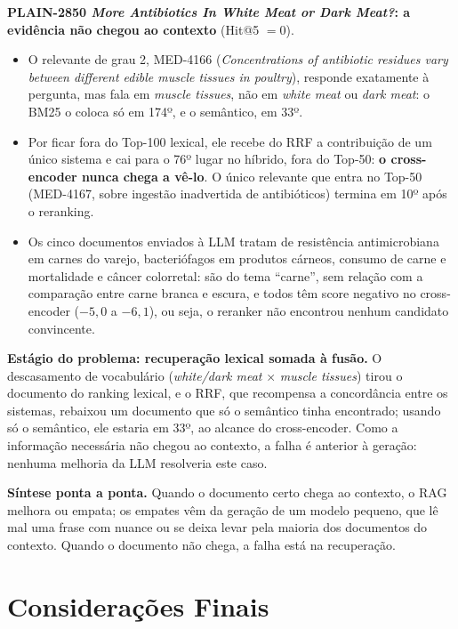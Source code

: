 \documentclass[10pt,a4paper]{article}
\newcommand{\med}[1]{\mbox{MED-#1}}         %
\newcommand{\pq}[1]{\mbox{PLAIN-#1}}        %
\begin{document}
\textbf{\pq{2850} \emph{More Antibiotics In White Meat or Dark Meat?}: a evidência não chegou ao contexto} (Hit@5 $= 0$).
\begin{itemize}
\item O relevante de grau 2, \med{4166} (\emph{Concentrations of antibiotic residues vary between different edible muscle tissues in poultry}), responde exatamente à pergunta, mas fala em \emph{muscle tissues}, não em \emph{white meat} ou \emph{dark meat}: o BM25 o coloca só em 174º, e o semântico, em 33º.
\item Por ficar fora do Top-100 lexical, ele recebe do RRF a contribuição de um único sistema e cai para o 76º lugar no híbrido, fora do Top-50: \textbf{o cross-encoder nunca chega a vê-lo}. O único relevante que entra no Top-50 (\med{4167}, sobre ingestão inadvertida de antibióticos) termina em 10º após o reranking.
\item Os cinco documentos enviados à LLM tratam de resistência antimicrobiana em carnes do varejo, bacteriófagos em produtos cárneos, consumo de carne e mortalidade e câncer colorretal: são do tema ``carne'', sem relação com a comparação entre carne branca e escura, e todos têm score negativo no cross-encoder ($-5{,}0$ a $-6{,}1$), ou seja, o reranker não encontrou nenhum candidato convincente.
\end{itemize}
\textbf{Estágio do problema: recuperação lexical somada à fusão.} O descasamento de vocabulário (\emph{white/dark meat} $\times$ \emph{muscle tissues}) tirou o documento do ranking lexical, e o RRF, que recompensa a concordância entre os sistemas, rebaixou um documento que só o semântico tinha encontrado; usando só o semântico, ele estaria em 33º, ao alcance do cross-encoder. Como a informação necessária não chegou ao contexto, a falha é anterior à geração: nenhuma melhoria da LLM resolveria este caso.

\textbf{Síntese ponta a ponta.} Quando o documento certo chega ao contexto, o RAG melhora ou empata; os empates vêm da geração de um modelo pequeno, que lê mal uma frase com nuance ou se deixa levar pela maioria dos documentos do contexto. Quando o documento não chega, a falha está na recuperação.

\section{Considerações Finais}
\end{document}
